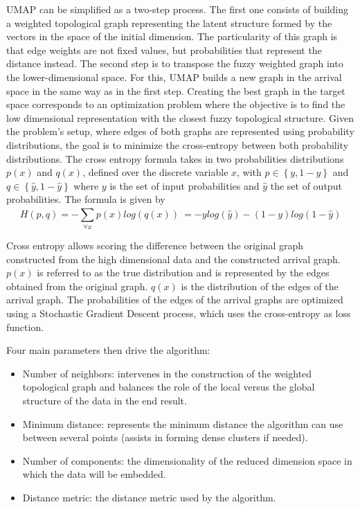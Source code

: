 UMAP can be simplified as a two-step process.
The first one consists of building a weighted topological graph representing the latent structure formed by the vectors in the space of the initial dimension.
The particularity of this graph is that edge weights are not fixed values, but probabilities
that represent the distance instead.
The second step is to transpose the fuzzy weighted graph into the lower-dimensional space.
For this, UMAP builds a new graph in the arrival space in the same way as in the first step.
Creating the best graph in the target space corresponds to an optimization problem where the objective is to find the low dimensional representation with the closest fuzzy topological structure.
Given the problem's setup, where edges of both graphs are represented using probability distributions, the goal is to minimize the cross-entropy between both probability distributions.
The cross entropy formula takes in two probabilities distributions \(p(x)\) and \(q(x)\),
defined over the discrete variable \(x\), with \( p \in \left\{y,1-y\right\}\) and \( q \in \left\{\hat{y},1-\hat{y}\right\}\)
where \(y\) is the set of input probabilities and \(\hat{y}\) the set of output probabilities.
The formula is given by
\[H(p,q)=-\sum_{\forall x}^{} p\left(x\right) log\left(q\left(x\right) \right)\ = -y log\left(\hat{y}\right) - \left(1-y\right) log\left(1 - \hat{y}\right)\]

Cross entropy allows scoring the difference between the original graph
constructed from the high dimensional data and the constructed arrival graph.
\(p(x)\) is referred to as the true distribution and is represented by the edges obtained from
the original graph.
\(q(x)\) is the distribution of the edges of the arrival graph.
The probabilities of the edges of the arrival graphs are optimized using a Stochastic
Gradient Descent process, which uses the cross-entropy as loss function.

Four main parameters then drive the algorithm:

\begin{itemize}
    \item Number of neighbors: intervenes in the construction of the weighted topological graph and balances the role of the local versus the global structure of the data in the end result.
    \item Minimum distance: represents the minimum distance the algorithm can use between several points (assists in forming dense clusters if needed).
    \item Number of components: the dimensionality of the reduced dimension space in which the data will be embedded.
    \item Distance metric: the distance metric used by the algorithm.
\end{itemize}

